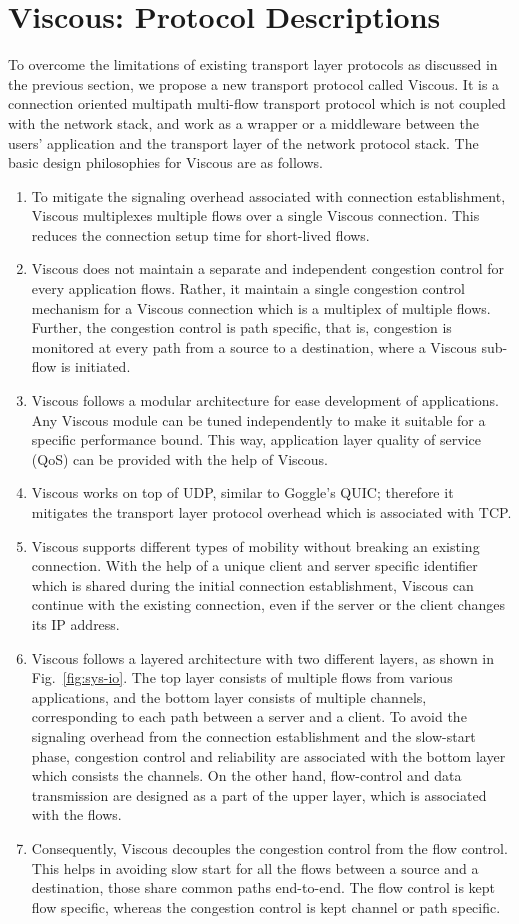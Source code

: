 \section{Viscous: Protocol Descriptions}
To overcome the limitations of existing transport layer protocols as discussed in the previous section, we propose a new transport protocol called Viscous. It is a connection oriented multipath multi-flow transport protocol which is not coupled with the network stack, and work as a wrapper or a middleware between the users' application and the transport layer of the network protocol stack. The basic design philosophies for Viscous are as follows. 
\begin{enumerate}
	\item To mitigate the signaling overhead associated with connection establishment, Viscous multiplexes multiple flows over a single Viscous connection. This reduces the connection setup time for short-lived flows. 
	\item Viscous does not maintain a separate and independent congestion control for every application flows. Rather, it maintain a single congestion control mechanism for a Viscous connection which is a multiplex of multiple flows. Further, the congestion control is path specific, that is, congestion is monitored at every path from a source to a destination, where a Viscous sub-flow is initiated.  
	\item Viscous follows a modular architecture for ease development of applications. Any Viscous module can be tuned independently to make it suitable for a specific performance bound. This way, application layer quality of service (QoS) can be provided with the help of Viscous. 
	\item Viscous works on top of UDP, similar to Goggle's QUIC; therefore it mitigates the transport layer protocol overhead which is associated with TCP. 
	\item Viscous supports different types of mobility without breaking an existing connection. With the help of a unique client and server specific identifier which is shared during the initial connection establishment, Viscous can continue with the existing connection, even if the server or the client changes its IP address.   
	\item Viscous follows a layered architecture with two different layers, as shown in Fig.~\ref{fig:sys-io}. The top layer consists of multiple flows from various applications, and the bottom layer consists of multiple channels, corresponding to each path between a server and a client. To avoid the signaling overhead from the connection establishment and the slow-start phase, congestion control and reliability are associated with the bottom layer which consists the channels. On the other hand, flow-control and data transmission are designed as a part of the upper layer, which is associated with the flows.
	\item Consequently, Viscous decouples the congestion control from the flow control. This helps in avoiding slow start for all the flows between a source and a destination, those share common paths end-to-end. The flow control is kept flow specific, whereas the congestion control is kept channel or path specific. 
\end{enumerate}
